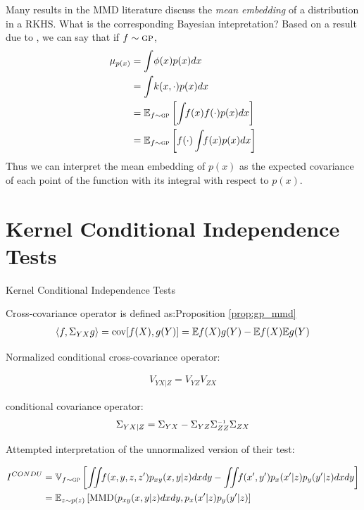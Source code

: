 \documentclass{article} %
\begin{document}
Many results in the MMD literature discuss the \emph{mean embedding} of a distribution in a RKHS.  What is the corresponding Bayesian intepretation?  Based on a result due to \cite{krikproof}, we can say that if $f \sim {\textsc{gp}}$,
%
\begin{align}
\mu_{p(x)} 	& = \int \! \phi(x) p(x) dx \\
		   	& = \int \! k(x, \cdot) p(x) dx \\
			& = \mathbb{E}_{f \sim {\textsc{gp}}} \left[ { \int \!\! f(x) f(\cdot) p(x) dx} \right] \\
			& = \mathbb{E}_{f \sim {\textsc{gp}}} \left[ { f(\cdot) \int \!\! f(x) p(x) dx} \right]			
\end{align}
%
Thus we can interpret the mean embedding of $p(x)$ as the expected covariance of each point of the function with its integral with respect to $p(x)$.


\section{Kernel Conditional Independence Tests}

Kernel Conditional Independence Tests \cite{fukumizu2008kernel}

Cross-covariance operator is defined as:Proposition \ref{prop:gp_mmd}
\begin{align}
\left\langle f, \Sigma_{YX} g\right\rangle = \operatorname{cov}[f(X), g(Y)] = \mathbb{E}{f(X)g(Y)} - \mathbb{E}{f(X)} \mathbb{E}{g(Y)}
\end{align}

Normalized conditional cross-covariance operator:

\begin{align}
V_{YX|Z} = V_{YZ} V_{ZX}
\end{align}

conditional covariance operator:
\begin{align}
\Sigma_{YX|Z} = \Sigma_{YX} - \Sigma_{YZ} \Sigma_{ZZ}\inv \Sigma_{ZX}
\end{align}

Attempted interpretation of the unnormalized version of their test:

\begin{align}
I^{CONDU} & = \varianceargs{f\sim \gp}{ \int \!\!\! \int\!\! f(x,y, z, z')p_{xy}(x,y|z)dxdy - \int \!\!\! \int\!\! f(x',y')p_x(x'|z)p_y(y'|z)dx dy} \\
& = \expectargs{z\sim p(z)}{\mmd( p_{xy}(x,y|z)dxdy, p_x(x'|z)p_y(y'|z)} \\
\end{align}
\end{document}

